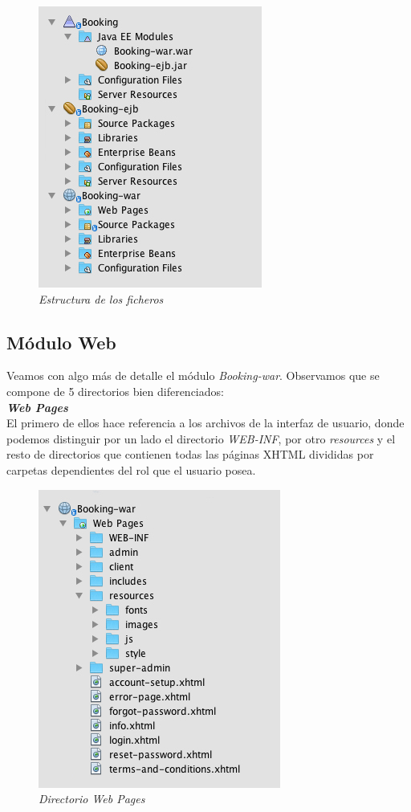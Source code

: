 \begin{figure}
\centering
  \includegraphics[scale=.65]{img/ficheros/estructura-ficheros.jpg}
  \caption{\textit{Estructura de los ficheros}}
  \label{fig:estructura-ficheros}
\end{figure}


\subsection{Módulo Web}

Veamos con algo más de detalle el módulo \textit{Booking-war}. Observamos que se compone de 5 directorios bien diferenciados:
\\

\textit{\textbf{Web Pages}}
\\

El primero de ellos hace referencia a los archivos de la interfaz de usuario, donde podemos distinguir por un lado el directorio \textit{WEB-INF}, por otro \textit{resources} y el resto de directorios que contienen todas las páginas XHTML divididas por carpetas dependientes del rol que el usuario posea. 

\begin{figure}
\centering
  \includegraphics[scale=.60]{img/ficheros/web-pages.jpg}
  \caption{\textit{Directorio Web Pages}}
  \label{fig:ficheros-pages}
\end{figure}



